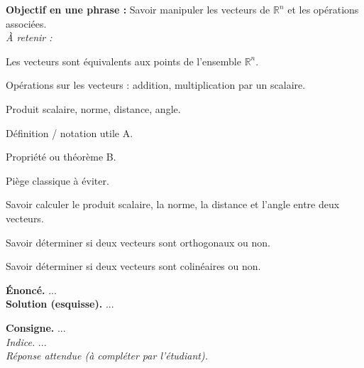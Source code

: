   \begin{resumeBox}
    \textbf{Objectif en une phrase :} Savoir manipuler les vecteurs de $\mathbb{R}^n$ et les opérations associées.\\[0.25em]
    \emph{À retenir :} 
    \begin{niceitemize}
      \item Les vecteurs sont équivalents aux points de l'ensemble $\mathbb{R}^n$.
      \item Opérations sur les vecteurs : addition, multiplication par un scalaire.
      \item Produit scalaire, norme, distance, angle.
    \end{niceitemize}
  \end{resumeBox}
  \begin{formulesBox}
  \end{formulesBox}
  \begin{rappelsBox}
    \begin{niceitemize}
      \item Définition / notation utile A.
      \item Propriété ou théorème B.
      \item Piège classique à éviter.
    \end{niceitemize}
  \end{rappelsBox}
  \begin{competencesBox}
    \begin{niceitemize}
      \item Savoir calculer le produit scalaire, la norme, la distance et l'angle entre deux vecteurs.
      \item Savoir déterminer si deux vecteurs sont orthogonaux ou non.
      \item Savoir déterminer si deux vecteurs sont colinéaires ou non.
    \end{niceitemize}
  \end{competencesBox}
  \begin{exempleBox}
    \textbf{Énoncé.} ...\\
    \textbf{Solution (esquisse).} ...
  \end{exempleBox}
  \begin{exerciceBox}
    \textbf{Consigne.} ...\\
    \textit{Indice.} ...\\
    \textit{Réponse attendue (à compléter par l'étudiant).}
  \end{exerciceBox}